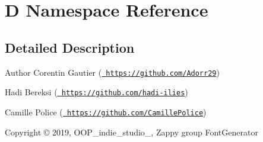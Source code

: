 \hypertarget{namespace_d}{}\section{D Namespace Reference}
\label{namespace_d}


\subsection{Detailed Description}
\begin{DoxyAuthor}{Author}
Corentin Gautier (\href{https://github.com/Adorr29}{\texttt{ https\+://github.\+com/\+Adorr29}}) 

Hadi Bereksi (\href{https://github.com/hadi-ilies}{\texttt{ https\+://github.\+com/hadi-\/ilies}}) 

Camille Police (\href{https://github.com/CamillePolice}{\texttt{ https\+://github.\+com/\+Camille\+Police}}) 
\end{DoxyAuthor}
\begin{DoxyCopyright}{Copyright}
© 2019, O\+O\+P\+\_\+indie\+\_\+studio\+\_, Zappy group Font\+Generator 
\end{DoxyCopyright}
